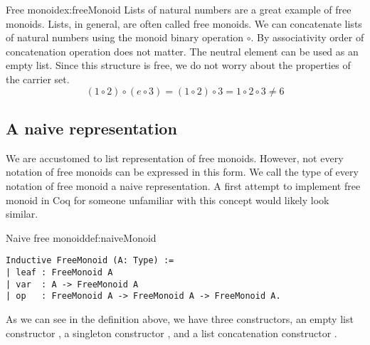 \begin{example}{Free monoid}{ex:freeMonoid}
Lists of natural numbers are a great example of free monoids. Lists, in general, are often called free monoids. We can concatenate lists of natural numbers using the monoid binary operation $\circ$. By associativity order of concatenation operation does not matter. The neutral element can be used as an empty list. Since this structure is free, we do not worry about the properties of the carrier set.
$$(1 \circ 2) \circ (e \circ 3) = (1 \circ 2) \circ 3 =  1 \circ 2 \circ 3 \not= 6$$
\end{example}
\subsection{A naive representation}
We are accustomed to list representation of free monoids. However, not every notation of free monoids can be expressed in this form. We call the type of every notation of free monoid a naive representation. A first attempt to implement free monoid in Coq for someone unfamiliar with this concept would likely look similar. 
\begin{defi}{Naive free monoid}{def:naiveMonoid}
\begin{verbatim}
Inductive FreeMonoid (A: Type) :=
| leaf : FreeMonoid A
| var  : A -> FreeMonoid A
| op   : FreeMonoid A -> FreeMonoid A -> FreeMonoid A.
\end{verbatim}
\end{defi}
As we can see in the definition above, we have three constructors, an empty list constructor , a singleton constructor , and a list concatenation constructor . 
